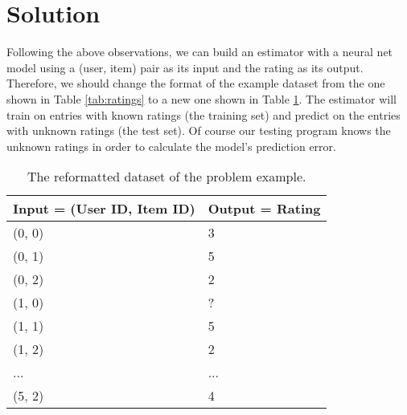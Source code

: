 \documentclass[letterpaper]{article}
\begin{document}
\section{Solution}
Following the above observations, we can build an estimator with a neural net 
model using a (user, item) pair as its input and the rating as its output.
Therefore, we should change the format of the example dataset from the one 
shown in Table \ref{tab:ratings} to a new one shown in Table \ref{tab:rating}.
The estimator will train on entries with known ratings (the training set) 
and predict on the entries with unknown ratings (the test set).
Of course our testing program knows the unknown ratings in order to calculate 
the model's prediction error.
\begin{table}[!htb]
	\centering
	\caption{The reformatted dataset of the problem example.}
	\begin{tabularx}{0.47\textwidth}{|X|X|}  \hline \rowcolor{blue!50}
		Input = (User ID, Item ID) & Output = Rating \\ \hline
		(0, 0)                     & 3 \\ \hline
		(0, 1)                     & 5 \\ \hline
		(0, 2)                     & 2 \\ \hline
		(1, 0)                     & ? \\ \hline
		(1, 1)                     & 5 \\ \hline
		(1, 2)                     & 2 \\ \hline
		...                        & ... \\ \hline
		(5, 2)                     & 4 \\ \hline
	\end{tabularx}
	\label{tab:rating}
\end{table}
\end{document}
